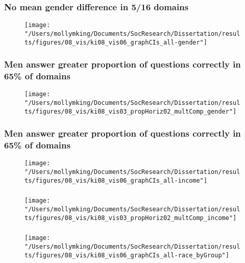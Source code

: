 \documentclass[pdf]{beamer}
\begin{document}
\begin{frame}
\frametitle{No mean gender difference in 5/16 domains}
  \begin{figure}[ht]
    \begin{center}
      \texttt{[image: "/Users/mollymking/Documents/SocResearch/Dissertation/results/figures/08\_vis/ki08\_vis06\_graphCIs\_all-gender"]}
    \end{center}
  \end{figure}
\end{frame}


\begin{frame}
\frametitle{Men answer greater proportion of questions correctly in 65\% of domains}
  \begin{figure}[ht]
    \begin{center}
      \texttt{[image: "/Users/mollymking/Documents/SocResearch/Dissertation/results/figures/08\_vis/ki08\_vis03\_propHoriz02\_multComp\_gender"]}
    \end{center}
  \end{figure}
\end{frame}


\begin{frame}
\frametitle{Men answer greater proportion of questions correctly in 65\% of domains}
  \begin{figure}[ht]
    \begin{center}
    \texttt{[image: "/Users/mollymking/Documents/SocResearch/Dissertation/results/figures/08\_vis/ki08\_vis06\_graphCIs\_all-income"]}
    \end{center}
  \end{figure}
\end{frame}


\begin{frame}
\frametitle{}
  \begin{figure}[ht]
    \begin{center}
    \texttt{[image: "/Users/mollymking/Documents/SocResearch/Dissertation/results/figures/08\_vis/ki08\_vis03\_propHoriz02\_multComp\_income"]}
    \end{center}
  \end{figure}
\end{frame}


\begin{frame}
\frametitle{}
  \begin{figure}[ht]
    \begin{center}
    \texttt{[image: "/Users/mollymking/Documents/SocResearch/Dissertation/results/figures/08\_vis/ki08\_vis06\_graphCIs\_all-race\_byGroup"]}
    \end{center}
  \end{figure}
\end{frame}
\end{document}
